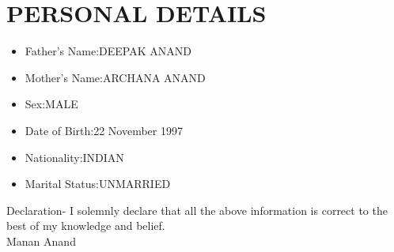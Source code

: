 \documentclass{article}
\begin{document}
\section{PERSONAL DETAILS}
\begin{itemize}
\item Father's Name:DEEPAK ANAND

\item Mother's Name:ARCHANA ANAND

\item Sex:MALE

\item Date of Birth:22 November 1997

\item Nationality:INDIAN

\item Marital Status:UNMARRIED
\end{itemize}
\Large Declaration-
I solemnly declare that all the above information is correct to the best of my knowledge and belief.\\
\LARGE Manan Anand\\
\date{\today}
\end{document}
